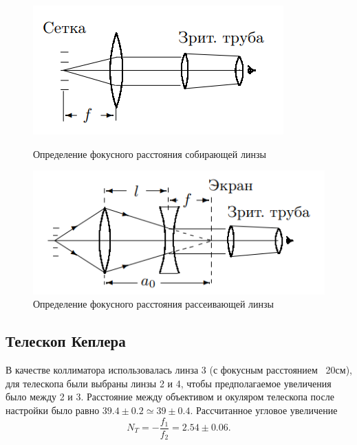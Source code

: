 \documentclass[a4paper, 12pt]{article}
\begin{document}
\begin{figure}[h]
\begin{center}
\begin{minipage}[h]{0.40\linewidth}
\includegraphics[width=1\linewidth]{plus_lens.PNG}
\caption{Определение фокусного расстояния собирающей линзы} %
\label{ris:experimoriginal} %
\end{minipage}
\hfill 
\begin{minipage}[h]{0.40\linewidth}
\includegraphics[width=1\linewidth]{minus_lens.PNG}
\caption{Определение фокусного расстояния рассеивающей линзы}
\label{ris:experimcoded}
\end{minipage}
\end{center}
\end{figure}

\newpage %



\subsection{Телескоп Кеплера}

В качестве коллиматора использовалась линза 3 (с фокусным расстоянием ~20см), для телескопа были выбраны линзы 2 и 4, чтобы предполагаемое увеличения было между 2 и 3. Расстояние между объективом и окуляром телескопа после настройки было равно $39.4 \pm 0.2 \simeq 39 \pm 0.4$. Рассчитанное угловое увеличение $$N_{T}=-\frac{f_{1}}{f_{2}}=2.54 \pm 0.06.$$
\end{document}
